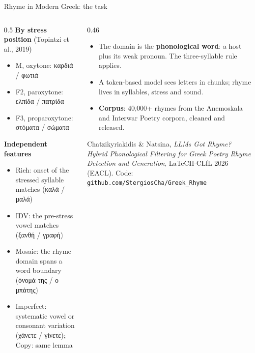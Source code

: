\documentclass[aspectratio=169, 10pt]{beamer}
\newcommand{\key}[1]{\textcolor{aegean}{\textbf{#1}}}
\begin{document}
\begin{frame}{Rhyme in Modern Greek: the task}
  \footnotesize
  \begin{columns}[T]
    \begin{column}{0.5\textwidth}
      \textbf{By stress position} (Topintzi et al., 2019)
      \begin{itemize}
        \item M, oxytone: καρδιά / φωτιά
        \item F2, paroxytone: ελπίδα / πατρίδα
        \item F3, proparoxytone: στόματα / σώματα
      \end{itemize}
      \textbf{Independent features}
      \begin{itemize}
        \item Rich: onset of the stressed syllable matches (καλά / μαλά)
        \item IDV: the pre-stress vowel matches (ξανθή / γραφή)
        \item Mosaic: the rhyme domain spans a word boundary (όνομά της / ο μπάτης)
        \item Imperfect: systematic vowel or consonant variation (χάνετε / γίνετε); Copy: same lemma
      \end{itemize}
    \end{column}
    \begin{column}{0.46\textwidth}
      \begin{itemize}
        \item The domain is the \textbf{phonological word}: a host plus its weak pronoun. The three-syllable rule applies.
        \item A token-based model sees letters in chunks; rhyme lives in syllables, stress and sound.
        \item \key{Corpus}: 40,000+ rhymes from the Anemoskala and Interwar Poetry corpora, cleaned and released.
      \end{itemize}
      \vspace{0.3em}
      \scriptsize Chatzikyriakidis \& Natsina, \emph{LLMs Got Rhyme? Hybrid Phonological Filtering for Greek Poetry Rhyme Detection and Generation}, LaTeCH-CLfL 2026 (EACL). Code: \texttt{github.com/StergiosCha/Greek\_Rhyme}
    \end{column}
  \end{columns}
\end{frame}
\end{document}
